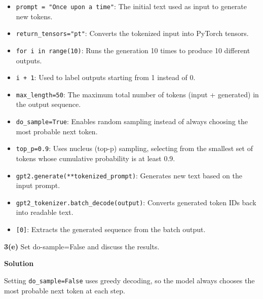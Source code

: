 \documentclass[10pt]{article}
\begin{document}
\begin{itemize}
	\item \texttt{prompt = "Once upon a time"}: The initial text used as input to generate new tokens.
	
	\item \texttt{return\_tensors="pt"}: Converts the tokenized input into PyTorch tensors.
	
	\item \texttt{for i in range(10)}: Runs the generation 10 times to produce 10 different outputs.
	
	\item \texttt{i + 1}: Used to label outputs starting from 1 instead of 0.
	
	\item \texttt{max\_length=50}: The maximum total number of tokens (input + generated) in the output sequence.
	
	\item \texttt{do\_sample=True}: Enables random sampling instead of always choosing the most probable next token.
	
	\item \texttt{top\_p=0.9}: Uses nucleus (top-p) sampling, selecting from the smallest set of tokens whose cumulative probability is at least 0.9.
	
	\item \texttt{gpt2.generate(**tokenized\_prompt)}: Generates new text based on the input prompt.
	
	\item \texttt{gpt2\_tokenizer.batch\_decode(output)}: Converts generated token IDs back into readable text.
	
	\item \texttt{[0]}: Extracts the generated sequence from the batch output.
\end{itemize}

\textbf{3(e)} Set do-sample=False and discuss the results.

\textbf{Solution}

Setting \texttt{do\_sample=False} uses greedy decoding, so the model always chooses the most probable next token at each step.
\end{document}
